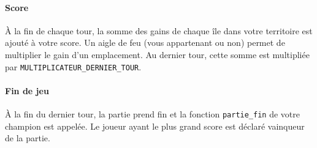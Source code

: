 \paragraph{Score}
À la fin de chaque tour, la somme des gains de chaque
île dans votre territoire est ajouté à votre score.
Un aigle de feu (vous appartenant ou non) permet de multiplier le gain d'un
emplacement.
Au dernier tour, cette somme est multipliée par
\texttt{MULTIPLICATEUR\_DERNIER\_TOUR}.

\paragraph{Fin de jeu}
À la fin du dernier tour, la partie prend fin
et la fonction \texttt{partie\_fin} de votre champion est appelée.
Le joueur ayant le plus grand score est déclaré vainqueur de la partie.
